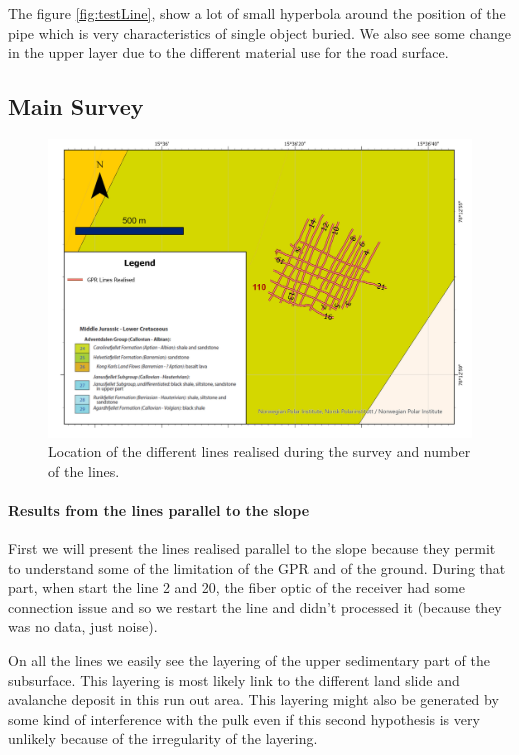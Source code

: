 The figure \ref{fig:testLine}, show a lot of small hyperbola around the position of the pipe which is very characteristics of single object buried. We also see some change in the upper layer due to the different material use for the road surface.


\subsection{Main Survey}

\begin{figure}
    \centering
    \includegraphics[width=\linewidth]{Images/00_Results/GPR LIne.jpg}
    \caption{Location of the different lines realised during the survey and number of the lines.}
    \label{fig:LocGPRLines}
\end{figure}

\paragraph{Results from the lines parallel to the slope} First we will present the lines realised parallel to the slope because they permit to understand some of the limitation of the GPR and of the ground. During that part, when start the line 2 and 20, the fiber optic of the receiver had some connection issue and so we restart the line and didn't processed it (because they was no data, just noise).

On all the lines we easily see the layering of the upper sedimentary part of the subsurface. This layering is most likely link to the different land slide and avalanche deposit in this run out area. This layering might also be generated by some kind of interference with the pulk even if this second hypothesis is very unlikely because of the irregularity of the layering.

